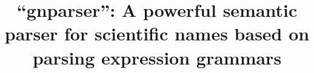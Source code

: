 \documentclass{bmcart}
\begin{document}
\begin{frontmatter}

\begin{fmbox}


\title{``gnparser'':  A powerful semantic parser for scientific names based on parsing expression grammars}



\author[
   addressref={aff1},
   corref={aff1},                       %
   email={mozzheri@illinois.edu}
]{ }
\author[                  %
   addressref={aff2},
   noteref={n1},%
   email={alexander@myltsev.com}   %
]{ }
\author[
   addressref={aff3},
   email={dpatterson.mbl@gmail.com}
]{ }


\address[id=aff1]{                     %
  ,    %
  ,         %
  ,                    %
  ,
  ,
}


\end{fmbox}
\end{frontmatter}
\end{document}
